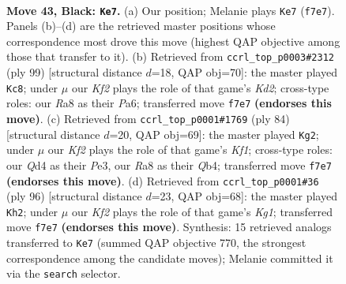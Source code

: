 \documentclass[11pt]{article}
\begin{document}
\clearpage

\begin{figure}[p]\centering
\begin{subfigure}{0.46\textwidth}\centering
\resizebox{\linewidth}{!}{%
\newchessgame
\chessboard[
  setfen={r7/5k2/5p2/3p3Q/3q1P2/p5P1/P5KP/8 b - - 6 43},
  showmover=false,
  pgfstyle=straightmove, color=movearrow, markmove={f7-e7}
]}
\caption{}
\end{subfigure}\hfill
\begin{subfigure}{0.46\textwidth}\centering
\resizebox{\linewidth}{!}{%
\newchessgame
\chessboard[
  setfen={8/3k1Q2/p2p4/1p1Pq2p/8/PP6/K1P5/8 b - - 7 50},
  showmover=false,
  pgfstyle=straightmove, color=movearrow, markmove={d7-c8}
]}
\caption{}
\end{subfigure}
\\[4pt]
\begin{subfigure}{0.46\textwidth}\centering
\resizebox{\linewidth}{!}{%
\newchessgame
\chessboard[
  setfen={6k1/1P3p2/4p3/5p1p/1Q3P2/2p1P3/5P2/3q1K2 w - - 7 43},
  showmover=false,
  pgfstyle=straightmove, color=movearrow, markmove={f1-g2}
]}
\caption{}
\end{subfigure}\hfill
\begin{subfigure}{0.46\textwidth}\centering
\resizebox{\linewidth}{!}{%
\newchessgame
\chessboard[
  setfen={8/6pk/7p/2Q1pp2/1P6/5P2/6P1/4q1K1 w - - 2 49},
  showmover=false,
  pgfstyle=straightmove, color=movearrow, markmove={g1-h2}
]}
\caption{}
\end{subfigure}
\caption{\textbf{Move 43, Black: \texttt{Ke7}.} (a) Our position; Melanie plays \texttt{Ke7} (\texttt{f7e7}). Panels (b)--(d) are the retrieved master positions whose correspondence most drove this move (highest QAP objective among those that transfer to it). (b) Retrieved from \texttt{ccrl\_top\_p0003\#2312} (ply 99) [structural distance $d$=18, QAP obj=70]: the master played \texttt{Kc8}; under $\mu$ our \emph{Kf2} plays the role of that game's \emph{Kd2}; cross-type roles: our \emph{R}a8 as their \emph{P}a6; transferred move \texttt{f7e7} \textbf{(endorses this move)}. (c) Retrieved from \texttt{ccrl\_top\_p0001\#1769} (ply 84) [structural distance $d$=20, QAP obj=69]: the master played \texttt{Kg2}; under $\mu$ our \emph{Kf2} plays the role of that game's \emph{Kf1}; cross-type roles: our \emph{Q}d4 as their \emph{P}e3, our \emph{R}a8 as their \emph{Q}b4; transferred move \texttt{f7e7} \textbf{(endorses this move)}. (d) Retrieved from \texttt{ccrl\_top\_p0001\#36} (ply 96) [structural distance $d$=23, QAP obj=68]: the master played \texttt{Kh2}; under $\mu$ our \emph{Kf2} plays the role of that game's \emph{Kg1}; transferred move \texttt{f7e7} \textbf{(endorses this move)}. Synthesis: 15 retrieved analogs transferred to \texttt{Ke7} (summed QAP objective 770, the strongest correspondence among the candidate moves); Melanie committed it via the \texttt{search} selector.}
\label{fig:thought-m85}
\end{figure}
\end{document}
